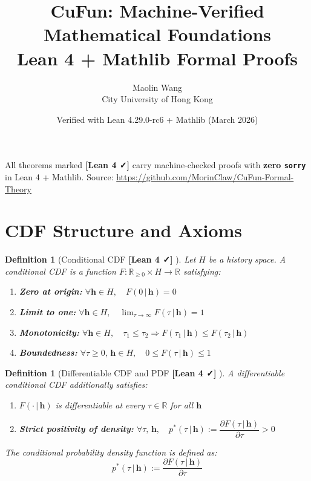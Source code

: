 \documentclass[11pt]{article}
\title{\textbf{CuFun: Machine-Verified Mathematical Foundations}\\
\large Lean 4 + Mathlib Formal Proofs}
\author{Maolin Wang \\ \small City University of Hong Kong}
\date{Verified with Lean 4.29.0-rc6 + Mathlib (March 2026)}
\newtheorem{definition}[theorem]{Definition}
\newcommand{\verified}{%
  \textcolor{green!60!black}{\textbf{[Lean 4 ✓]}}%
}
\newcommand{\R}{\mathbb{R}}
\newcommand{\hhat}{\boldsymbol{h}}
\begin{document}
\maketitle

\begin{tcolorbox}[colback=green!5!white, colframe=green!50!black, title=Verification Status]
All theorems marked \verified{} carry machine-checked proofs with \textbf{zero \texttt{sorry}}
in Lean 4 + Mathlib. Source: \url{https://github.com/MorinClaw/CuFun-Formal-Theory}
\end{tcolorbox}

\tableofcontents
\bigskip

\section{CDF Structure and Axioms}

\begin{definition}[Conditional CDF \verified{}]
\label{def:cdf}
Let $H$ be a history space. A \emph{conditional CDF} is a function
$F : \R_{\geq 0} \times H \to \R$ satisfying:
\begin{enumerate}
  \item \textbf{Zero at origin:} $\forall \hhat \in H,\quad F(0\,|\,\hhat) = 0$
  \item \textbf{Limit to one:} $\forall \hhat \in H,\quad \lim_{\tau\to\infty} F(\tau\,|\,\hhat) = 1$
  \item \textbf{Monotonicity:} $\forall \hhat \in H,\quad \tau_1 \leq \tau_2 \Rightarrow F(\tau_1\,|\,\hhat) \leq F(\tau_2\,|\,\hhat)$
  \item \textbf{Boundedness:} $\forall \tau \geq 0,\, \hhat \in H,\quad 0 \leq F(\tau\,|\,\hhat) \leq 1$
\end{enumerate}
\end{definition}

\begin{definition}[Differentiable CDF and PDF \verified{}]
A \emph{differentiable conditional CDF} additionally satisfies:
\begin{enumerate}
  \item $F(\cdot\,|\,\hhat)$ is differentiable at every $\tau \in \R$ for all $\hhat$
  \item \textbf{Strict positivity of density:}
  $\forall \tau,\, \hhat,\quad p^*(\tau\,|\,\hhat) := \dfrac{\partial F(\tau\,|\,\hhat)}{\partial \tau} > 0$
\end{enumerate}
The \emph{conditional probability density function} is defined as:
\[
  p^*(\tau\,|\,\hhat) := \frac{\partial F(\tau\,|\,\hhat)}{\partial \tau}
\]
\end{definition}
\end{document}

